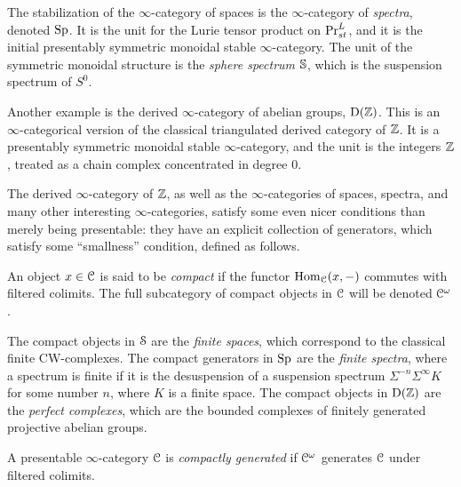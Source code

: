 \begin{example}
    The stabilization of the $\infty$-category of spaces is the $\infty$-category of \emph{spectra}, denoted $\Sp$. It is the unit for the Lurie tensor product on $\PrLs$, and it is the initial presentably symmetric monoidal stable $\infty$-category. The unit of the symmetric monoidal structure is the \emph{sphere spectrum} $\S$, which is the suspension spectrum of $S^0$.  
\end{example}

\begin{example}
    Another example is the derived $\infty$-category of abelian groups, $\Der(\Z)$. This is an $\infty$-categorical version of the classical triangulated derived category of $\Z$. It is a presentably symmetric monoidal stable $\infty$-category, and the unit is the integers $\Z$, treated as a chain complex concentrated in degree $0$. 
\end{example}

The derived $\infty$-category of $\Z$, as well as the $\infty$-categories of spaces, spectra, and many other interesting $\infty$-categories, satisfy some even nicer conditions than merely being presentable: they have an explicit collection of generators, which satisfy some ``smallness'' condition, defined as follows. 

\begin{definition}
    \label{ch0:def:compact-object}
    An object $x\in \C$ is said to be \emph{compact} if the functor $\Hom_\C(x,-)$ commutes with filtered colimits. The full subcategory of compact objects in $\C$ will be denoted $\Co$.
\end{definition}

\begin{example}
    The compact objects in $\Spaces$ are the \emph{finite spaces}, which correspond to the classical finite CW-complexes. The compact generators in $\Sp$ are the \emph{finite spectra}, where a spectrum is finite if it is the desuspension of a suspension spectrum $\Sigma^{-n}\Sigma^\infty K$ for some number $n$, where $K$ is a finite space. The compact objects in $\Der(\Z)$ are the \emph{perfect complexes}, which are the bounded complexes of finitely generated projective abelian groups. 
\end{example}

\begin{definition}
    \label{ch0:def:compactly-generated-category}
    A presentable $\infty$-category $\C$ is \emph{compactly generated} if $\Co$ generates $\C$ under filtered colimits. 
\end{definition}

